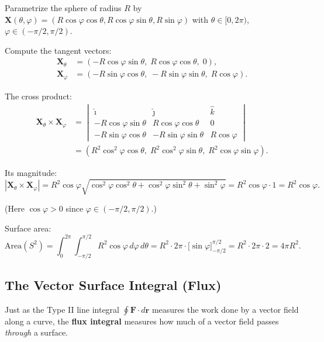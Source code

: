 \documentclass[11pt]{report}
\begin{document}
\begin{example}
Parametrize the sphere of radius $R$ by $\mathbf{X}(\theta, \varphi) = (R\cos\varphi\cos\theta, R\cos\varphi\sin\theta, R\sin\varphi)$ with $\theta \in [0, 2\pi)$, $\varphi \in (-\pi/2, \pi/2)$.

Compute the tangent vectors:
\begin{align*}
\mathbf{X}_\theta &= (-R\cos\varphi\sin\theta, \; R\cos\varphi\cos\theta, \; 0), \\
\mathbf{X}_\varphi &= (-R\sin\varphi\cos\theta, \; -R\sin\varphi\sin\theta, \; R\cos\varphi).
\end{align*}

The cross product:
\begin{align*}
\mathbf{X}_\theta \times \mathbf{X}_\varphi &= \begin{vmatrix} \hat{\imath} & \hat{\jmath} & \hat{k} \\ -R\cos\varphi\sin\theta & R\cos\varphi\cos\theta & 0 \\ -R\sin\varphi\cos\theta & -R\sin\varphi\sin\theta & R\cos\varphi \end{vmatrix} \\
&= (R^2\cos^2\!\varphi\cos\theta, \; R^2\cos^2\!\varphi\sin\theta, \; R^2\cos\varphi\sin\varphi).
\end{align*}

Its magnitude:
\[
|\mathbf{X}_\theta \times \mathbf{X}_\varphi| = R^2\cos\varphi \sqrt{\cos^2\!\varphi\cos^2\!\theta + \cos^2\!\varphi\sin^2\!\theta + \sin^2\!\varphi} = R^2\cos\varphi \cdot 1 = R^2\cos\varphi.
\]

(Here $\cos\varphi > 0$ since $\varphi \in (-\pi/2, \pi/2)$.)

Surface area:
\[
\text{Area}(S^2) = \int_0^{2\pi} \int_{-\pi/2}^{\pi/2} R^2 \cos\varphi \, d\varphi \, d\theta = R^2 \cdot 2\pi \cdot \big[\sin\varphi\big]_{-\pi/2}^{\pi/2} = R^2 \cdot 2\pi \cdot 2 = \boxed{4\pi R^2}.
\]
\end{example}

\subsection{The Vector Surface Integral (Flux)}

Just as the Type II line integral $\oint \mathbf{F} \cdot d\mathbf{r}$ measures the work done by a vector field along a curve, the \textbf{flux integral} measures how much of a vector field passes \textit{through} a surface.
\end{document}
